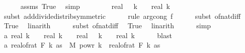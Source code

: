 \begin{isabellebody}
\ \ \ \ \isamarkupfalse%
\ assms\ True\ \isamarkupfalse%
\ simp\isanewline
\ \ \isamarkupfalse%
\ \isamarkupfalse%
\ {\isachardoublequoteopen}{\isachardot}{\kern0pt}{\isachardot}{\kern0pt}{\isachardot}{\kern0pt}\ {\isacharequal}{\kern0pt}\ \ real\ {\isacharparenleft}{\kern0pt}{}\ {\isacharasterisk}{\kern0pt}\ k\ {\isacharminus}{\kern0pt}\ {}{\isacharparenright}{\kern0pt}\ {\isacharslash}{\kern0pt}\ real\ k{\isachardoublequoteclose}\isanewline
\ \ \ \ \isamarkupfalse%
\ {\isacharparenleft}{\kern0pt}subst\ add{\isacharunderscore}{\kern0pt}divide{\isacharunderscore}{\kern0pt}distrib{\isacharbrackleft}{\kern0pt}symmetric{\isacharbrackright}{\kern0pt}{\isacharparenright}{\kern0pt}\isanewline
\ \ \ \ \isamarkupfalse%
\ {\isacharparenleft}{\kern0pt}rule\ arg{\isacharunderscore}{\kern0pt}cong{}{\isacharbrackleft}{\kern0pt}\ f{\isacharequal}{\kern0pt}{\isachardoublequoteopen}{\isacharparenleft}{\kern0pt}{\isacharslash}{\kern0pt}{\isacharparenright}{\kern0pt}{\isachardoublequoteclose}{\isacharbrackright}{\kern0pt}{\isacharparenright}{\kern0pt}\isanewline
\ \ \ \ \isamarkupfalse%
\ {\isacharparenleft}{\kern0pt}subst\ of{\isacharunderscore}{\kern0pt}nat{\isacharunderscore}{\kern0pt}diff{\isacharparenright}{\kern0pt}\ \isamarkupfalse%
\ True\ \isamarkupfalse%
\ linarith\isanewline
\ \ \ \ \isamarkupfalse%
\ {\isacharparenleft}{\kern0pt}subst\ of{\isacharunderscore}{\kern0pt}nat{\isacharunderscore}{\kern0pt}diff{\isacharparenright}{\kern0pt}\ \isamarkupfalse%
\ True\ \isamarkupfalse%
\ linarith\isanewline
\ \ \ \ \isamarkupfalse%
\ simp{\isacharplus}{\kern0pt}\isanewline
\ \ \isamarkupfalse%
\ \isamarkupfalse%
\ a{}{\isacharcolon}{\kern0pt}\ {\isachardoublequoteopen}real\ {\isacharparenleft}{\kern0pt}k\ {\isacharminus}{\kern0pt}\ {}{\isacharparenright}{\kern0pt}\ {\isacharslash}{\kern0pt}\ real\ k\ {\isacharplus}{\kern0pt}\ {}\ {\isacharequal}{\kern0pt}\ real\ {\isacharparenleft}{\kern0pt}{}\ {\isacharasterisk}{\kern0pt}\ k\ {\isacharminus}{\kern0pt}\ {}{\isacharparenright}{\kern0pt}\ {\isacharslash}{\kern0pt}\ real\ k{\isachardoublequoteclose}\isanewline
\ \ \ \ \isamarkupfalse%
\ blast\isanewline
\isanewline
\ \ \isamarkupfalse%
\ a{\isacharcolon}{\kern0pt}\ {\isachardoublequoteopen}real{\isacharunderscore}{\kern0pt}of{\isacharunderscore}{\kern0pt}rat\ {\isacharparenleft}{\kern0pt}F\ {\isacharparenleft}{\kern0pt}{}{\isacharasterisk}{\kern0pt}k{\isacharminus}{\kern0pt}{}{\isacharparenright}{\kern0pt}\ as{\isacharparenright}{\kern0pt}\ {\isasymle}\ M\ powr\ {\isacharparenleft}{\kern0pt}k{\isacharminus}{\kern0pt}{}{\isacharparenright}{\kern0pt}\ {\isacharasterisk}{\kern0pt}\ {\isacharparenleft}{\kern0pt}real{\isacharunderscore}{\kern0pt}of{\isacharunderscore}{\kern0pt}rat\ {\isacharparenleft}{\kern0pt}F\ k\ as{\isacharparenright}{\kern0pt}{\isacharparenright}{\kern0pt}\ {\isachardoublequoteclose}\isanewline

\end{isabellebody}
